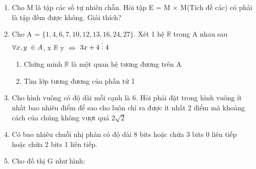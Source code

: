 \documentclass[12pt, a4paper]{article}
\begin{document}
\begin{enumerate}[label = {\bf Câu \arabic*.}]
    \item Cho M là tập các số tự nhiên chẵn. Hỏi tập E = M $\times$ M(Tích đề các) có phải là tập đếm được không. Giải thích?
    
    \item Cho A = $\{1, 4, 6, 7, 10, 12, 13, 16, 24, 27\}.$ Xét 1 hệ $\mathbb{R}$ trong A nhau sau $\forall x, y \thickspace \in A$, x $\mathbb{R}$ y $\Leftrightarrow$ $3x+4 \thickspace \vdots\thickspace 4$
    \begin{enumerate}[label = \alph*)]
        \item Chứng minh $\mathbb{R}$ là một quan hệ tương đương trên A
        \item Tìm lớp tương đương của phần tử 1
    \end{enumerate}

    \item Cho hình vuông có độ dài mỗi cạnh là 6. Hỏi phải đặt trong hình vuông ít nhất bao nhiêu điểm để sao cho luôn chỉ ra được ít nhất 2 điểm mà khoảng cách của chúng không vượt quá $2\sqrt{2}$

    \item Có bao nhiêu chuỗi nhị phân có độ dài 8 bits hoặc chứa 3 bits 0 liên tiếp hoặc chứa 2 bits 1 liên tiếp.

    \item Cho đồ thị G như hình:
    \begin{center}
        


\begin{tikzpicture}[x=0.75pt,y=0.75pt,yscale=-1,xscale=1]


\end{tikzpicture}
\end{center}
\end{enumerate}
\end{document}
